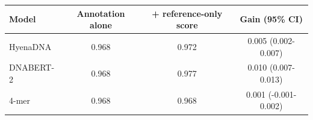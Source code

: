 \begin{tabular}{lccc}\toprule
Model & Annotation alone & + reference-only score & Gain (95\% CI)\\\midrule
HyenaDNA & 0.968 & 0.972 & 0.005 (0.002-0.007)\\
DNABERT-2 & 0.968 & 0.977 & 0.010 (0.007-0.013)\\
4-mer & 0.968 & 0.968 & 0.001 (-0.001-0.002)\\
\bottomrule\end{tabular}
